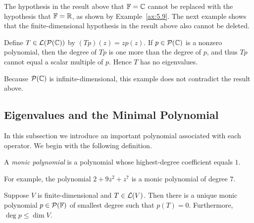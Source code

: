 The hypothesis in the result above that $\mathbb{F}=\mathbb{C}$ cannot be replaced with the
hypothesis that $\mathbb{F}=\mathbb{R}$, as shown by Example~\ref{ax:5.9}. The next example
shows that the finite-dimensional hypothesis in the result above also cannot
be deleted.

\begin{example}\label{ax:5.20}
Define $T\in\mathcal{L}(\mathcal{P}(\mathbb{C}))$ by $(Tp)(z)=zp(z)$. If $p\in\mathcal{P}(\mathbb{C})$ is a
nonzero polynomial, then the degree of $Tp$ is one more than the degree of
$p$, and thus $Tp$ cannot equal a scalar multiple of $p$. Hence $T$ has no
eigenvalues.

Because $\mathcal{P}(\mathbb{C})$ is infinite-dimensional, this example does not contradict
the result above.
\end{example}

\subsection{Eigenvalues and the Minimal Polynomial}

In this subsection we introduce an important polynomial associated with each
operator. We begin with the following definition.

\begin{definition}\label{ax:5.21}
A \emph{monic polynomial} is a polynomial whose highest-degree coefficient
equals $1$.
\end{definition}

For example, the polynomial $2+9z^2+z^7$ is a monic polynomial of degree $7$.

\begin{result}\label{ax:5.22}
Suppose $V$ is finite-dimensional and $T\in\mathcal{L}(V)$. Then there is a unique
monic polynomial $p\in\mathcal{P}(\mathbb{F})$ of smallest degree such that $p(T)=0$.
Furthermore, $\deg p\le\dim V$.
\end{result}

